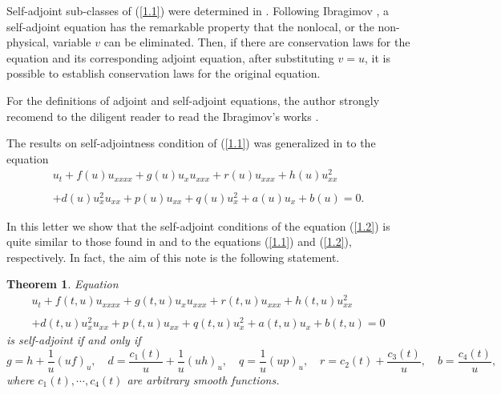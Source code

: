 \documentclass[11pt,letterpaper,twoside]{article}
\newcommand{\f}{\frac}
\newtheorem{theorem}{Theorem}%
\newcommand{\bb}{\begin{equation}}
\newcommand{\ee}{\end{equation}}
\newcommand{\ba}{\begin{array}}
\newcommand{\ea}{\end{array}}
\begin{document}
Self-adjoint sub-classes of (\ref{1.1}) were determined in \cite{ib1}. Following Ibragimov \cite{ib3}, a self-adjoint equation has the remarkable property that the nonlocal, or the non-physical, variable $v$ can be eliminated. Then, if there are conservation laws for the equation and its corresponding adjoint equation, after substituting $v=u$, it is possible to establish conservation laws for the original equation. 

For the definitions of adjoint and self-adjoint equations, the author strongly recomend to the diligent reader to read the Ibragimov's works \cite{ib2,ib3,ib4}.

The results on self-adjointness condition of (\ref{1.1}) was generalized in \cite{i1} to the equation
\bb\label{1.2}
\ba{l}
u_{t}+f(u)u_{xxxx}+g(u)u_{x}u_{xxx}+r(u)u_{xxx}+h(u)u_{xx}^{2}\\
\\
+d(u)u_{x}^{2}u_{xx}+p(u)u_{xx}+q(u)u_{x}^{2}+a(u)u_{x}+b(u)=0.
\ea
\ee

In this letter we show that the self-adjoint conditions of the equation (\ref{1.2}) is quite similar to those found in \cite{ib1} and \cite{i1} to the equations (\ref{1.1}) and (\ref{1.2}), respectively. In fact, the aim of this note is the following statement.

\begin{theorem}\label{teo1}
Equation 
\bb\label{1.3}
\ba{l}
u_{t}+f(t,u)u_{xxxx}+g(t,u)u_{x}u_{xxx}+r(t,u)u_{xxx}+h(t,u)u_{xx}^{2}\\
\\
+d(t,u)u_{x}^{2}u_{xx}+p(t,u)u_{xx}+q(t,u)u_{x}^{2}+a(t,u)u_{x}+b(t,u)=0
\ea
\ee
is self-adjoint if and only if
\bb\label{1.4}
g=h+\f{1}{u}(uf)_{u},\,\,\,\,\,\,d=\f{c_{1}(t)}{u}+\f{1}{u}(uh)_{u},\,\,\,\,\,\,q=\f{1}{u}(up)_{u},\,\,\,\,\,\,r=c_{2}(t)+\f{c_{3}(t)}{u},\,\,\,\,\,\,b=\f{c_{4}(t)}{u},
\ee
where  $c_{1}(t),\cdots,c_{4}(t)$ are arbitrary smooth functions. 
\end{theorem}
\end{document}
